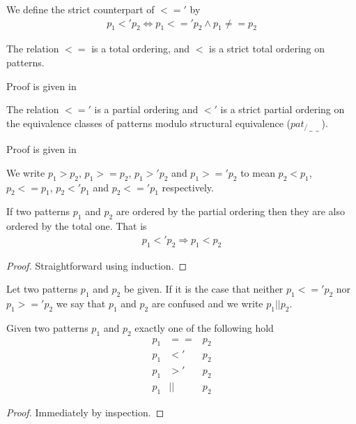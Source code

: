 \begin{definition}\label{def:pat-partial-order-strict}
  We define the strict counterpart of $<='$ by
  \begin{eqnarray*}
      p_1 <' p_2 \Longleftrightarrow p_1 <=' p_2 \land p_1 \not == p_2
  \end{eqnarray*}
\end{definition}

\begin{lemma}\label{lem:pat-total-orderings}
  The relation $<=$ is a total ordering, and $<$ is a strict total ordering on
  patterns.

  Proof is given in 
\end{lemma}


\begin{lemma}\label{lem:pat-partial-orderings}
  The relation $<='$ is a partial ordering and $<'$ is a strict partial ordering
  on the equivalence classes of patterns modulo structural equivalence
  ($pat_{/_{==}}$).

  Proof is given in 
\end{lemma}

We write $p_1 > p_2$, $p_1 >= p_2$, $p_1 >' p_2$ and $p_1 >=' p_2$ to mean $p_2
< p_1$, $p_2 <= p_1$, $p_2 <' p_1$ and $p_2 <=' p_1$ respectively.

\begin{lemma}[]\label{lem:total-implies-partial}
  If two patterns $p_1$ and $p_2$ are ordered by the partial ordering then they
  are also ordered by the total one. That is
  \begin{eqnarray*}
    p_1 <' p_2 \Longrightarrow p_1 < p_2
  \end{eqnarray*}
\end{lemma}
\begin{proof}
  Straightforward using induction.
\end{proof}

\begin{definition}[Confusion, $||$]\label{def:pat-confusion}
  Let two patterns $p_1$ and $p_2$ be given. If it is the case that neither $p_1
  <=' p_2$ nor $p_1 >=' p_2$ we say that $p_1$ and $p_2$ are confused and we
  write $p_1 || p_2$.
\end{definition}

\begin{lemma}\label{lem:unique-rel}
  Given two patterns $p_1$ and $p_2$ exactly one of the following hold
  \begin{eqnarray*}
    p_1 &==& p_2\\
    p_1 &<'& p_2\\
    p_1 &>'& p_2\\
    p_1 &||& p_2
  \end{eqnarray*}
\end{lemma}
\begin{proof}
  Immediately by inspection.
\end{proof}

